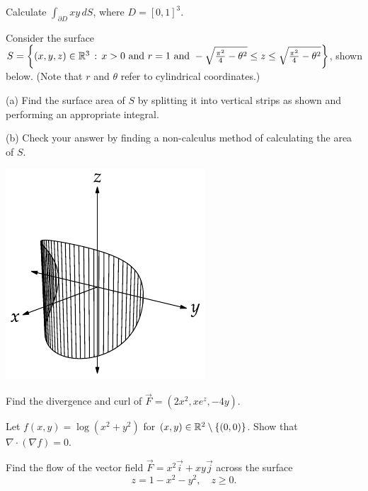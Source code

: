\documentclass[svgnames]{watsonbook}
\begin{document}
\begin{aexercise}
  Calculate $\int_{\partial D}xy\,dS$, where $D=[0,1]^3$.
\end{aexercise}


\begin{aexercise}
  Consider the surface
  $S=\left\{(x,y,z)\in \mathbb{R}^3\,:\,x>0\text{ and }r = 1\text{ and
    }-\sqrt{\frac{\pi^2}{4}-\theta^2}\leq z\leq
    \sqrt{\frac{\pi^2}{4}-\theta^2}\right\}$, shown below. (Note that
  $r$ and $\theta$ refer to cylindrical coordinates.)

  (a) Find the surface area of $S$ by splitting it into vertical
  strips as shown and performing an appropriate integral. 

  (b) Check your answer by finding a non-calculus method of
  calculating the area of $S$.

\begin{center}
  \includegraphics{exercisefigures/label}
\end{center}
\end{aexercise}


\begin{aexercise}
  Find the divergence and curl of $\vec{F} = (2x^2, xe^z, -4y)$.
\end{aexercise}

\begin{aexercise}
  Let $f(x,y) = \log(x^2 + y^2)$ for
  $(x,y)\in \mathbb{R}^2 \setminus \{(0,0)\}$. Show that
  $\nabla \cdot (\nabla f) = 0$.
\end{aexercise}

\begin{aexercise}
Find the flow of the vector field $\vec{F} = x^2\vec{i} + xy\vec{j}$ across the surface 
\[
z = 1-x^2-y^2, \quad z \geq 0. 
\]
\end{aexercise}
\end{document}
